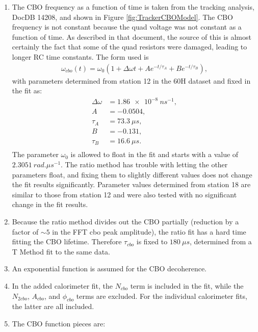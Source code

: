 	\begin{enumerate}
		\item{The CBO frequency as a function of time is taken from the tracking analysis, DocDB 14208, and shown in Figure \ref{fig:TrackerCBOModel}. The CBO frequency is not constant because the quad voltage was not constant as a function of time. As described in that document, the source of this is almost certainly the fact that some of the quad resistors were damaged, leading to longer RC time constants. The form used is 
			\begin{gather}
				\omega_{cbo}(t) = \omega_{0}(1 + \Delta\omega t + A e^{-t/\tau_{A}} + B e^{-t/\tau_{B}}),
			\label{Eqn:CBOFreq}
			\end{gather}
		with parameters determined from station 12 in the 60H dataset and fixed in the fit as:
			\begin{equation*}	
			\begin{aligned}
			 	\Delta\omega &= \SI{1.86e-8}{ns^{-1}}, \\
			 	A &= -0.0504, \\
			 	\tau_{A} &= \SI{73.3}{\mu s}, \\
			 	B &= -0.131, \\
			 	\tau_{B} &= \SI{16.6}{\mu s}. \\
			\end{aligned}
			\end{equation*}
		The parameter $\omega_{0}$ is allowed to float in the fit and starts with a value of $\SI{2.3051}{rad.\mu s^{-1}}$. The ratio method has trouble with letting the other parameters float, and fixing them to slightly different values does not change the fit results significantly. Parameter values determined from station 18 are similar to those from station 12 and were also tested with no significant change in the fit results.}
		\item{Because the ratio method divides out the CBO partially (reduction by a factor of $\sim5$ in the FFT cbo peak amplitude), the ratio fit has a hard time fitting the CBO lifetime. Therefore $\tau_{cbo}$ is fixed to $\SI{180}{\mu s}$, determined from a T Method fit to the same data.}
		\item{An exponential function is assumed for the CBO decoherence.}
		\item{In the added calorimeter fit, the $N_{cbo}$ term is included in the fit, while the $N_{2cbo}$, $A_{cbo}$, and $\phi_{cbo}$ terms are excluded. For the individual calorimeter fits, the latter are all included.}
		\item{The CBO function pieces are:
}
\end{enumerate}
